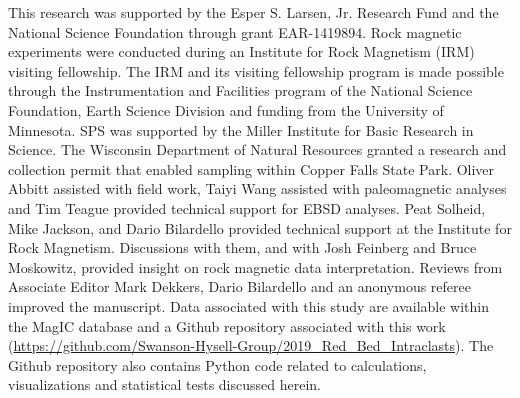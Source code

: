 \documentclass[draft]{agujournal2018}
\begin{document}
%
%
%
%
%
%
%
%


\acknowledgments
This research was supported by the Esper S. Larsen, Jr. Research Fund and the National Science Foundation through grant EAR-1419894. Rock magnetic experiments were conducted during an Institute for Rock Magnetism (IRM) visiting fellowship. The IRM and its visiting fellowship program is made possible through the Instrumentation and Facilities program of the National Science Foundation, Earth Science Division and funding from the University of Minnesota. SPS was supported by the Miller Institute for Basic Research in Science. The Wisconsin Department of Natural Resources granted a research and collection permit that enabled sampling within Copper Falls State Park. Oliver Abbitt assisted with field work, Taiyi Wang assisted with paleomagnetic analyses and Tim Teague provided technical support for EBSD analyses. Peat Solheid, Mike Jackson, and Dario Bilardello provided technical support at the Institute for Rock Magnetism. Discussions with them, and with Josh Feinberg and Bruce Moskowitz, provided insight on rock magnetic data interpretation. Reviews from Associate Editor Mark Dekkers, Dario Bilardello and an anonymous referee improved the manuscript. Data associated with this study are available within the MagIC database and a Github repository associated with this work (\url{https://github.com/Swanson-Hysell-Group/2019_Red_Bed_Intraclasts}). The Github repository also contains Python code related to calculations, visualizations and statistical tests discussed herein.  



%

%





\end{document}
